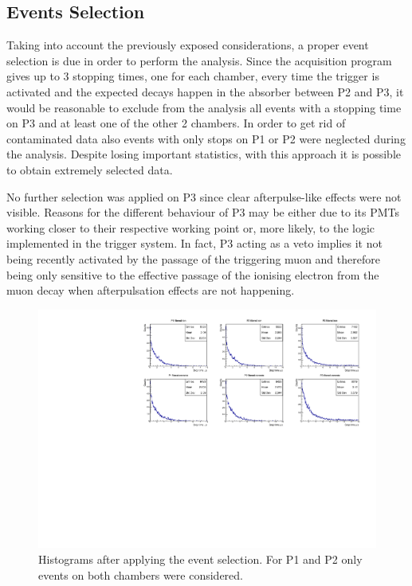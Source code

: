 \documentclass[../main.tex]{subfiles}
\begin{document}
\subsection{Events Selection}

Taking into account the previously exposed considerations, a proper event selection is due in order to perform the analysis. Since the acquisition program gives up to 3 stopping times, one for each chamber, every time the trigger is activated and the expected decays happen in the absorber between P2 and P3, it would be reasonable to exclude from the analysis all events with a stopping time on P3 and at least one of the other 2 chambers. In order to get rid of contaminated data also events with only stops on P1 or P2 were neglected during the analysis. Despite losing important statistics, with this approach it is possible to obtain extremely selected data. 

No further selection was applied on P3 since clear afterpulse-like effects were not visible. Reasons for the different behaviour of P3 may be either due to its PMTs working closer to their respective working point or, more likely, to the logic implemented in the trigger system. In fact, P3 acting as a veto implies it not being recently activated by the passage of the triggering muon and therefore being only sensitive to the effective passage of the ionising electron from the muon decay when afterpulsation effects are not happening.

\begin{figure}[htb!]
    \centering
    \includegraphics[width=\linewidth]{images/filtered_histograms.pdf}
    \caption{Histograms after applying the event selection. For P1 and P2 only events on both chambers were considered.}
    \label{fig:filteredhistograms}
\end{figure}
\end{document}
